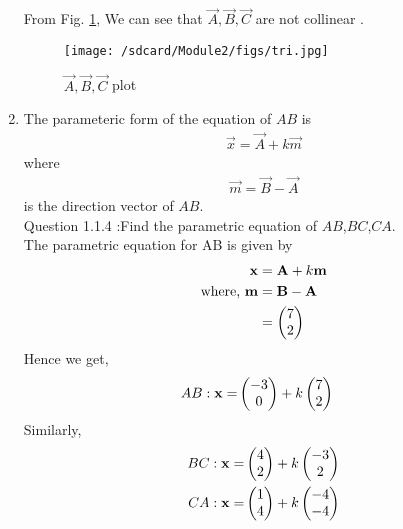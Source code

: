 \documentclass[11pt]{book}
\begin{document}
\begin{enumerate}[label=\thesection.\arabic*.,ref=\thesection.\theenumi]
From Fig. \ref{fig1:Triangle}, We can see that $\vec{A},\vec{B},\vec{C}$ are not collinear .
\begin{figure}[h]
\centering
\texttt{[image: /sdcard/Module2/figs/tri.jpg]}
\caption{$\vec{A},\vec{B},\vec{C}$ plot}
\label{fig1:Triangle}
\end{figure}



\item The parameteric form of the equation  of $AB$ is 
		\begin{align}
			\vec{x}=\vec{A}+k\vec{m}
		\end{align}
		where
		\begin{align}
\vec{m}=\vec{B}-\vec{A}
		\end{align}
is the direction vector of $AB$.\\
Question 1.1.4 :Find the parametric equation of $AB$,$BC$,$CA$.\\
\solution
The parametric equation for AB is given by
\begin{align}
\mathbf{x} &= \mathbf{A} + k\mathbf{m}\\
\text{where, } \mathbf{m} &= \mathbf{B} -\mathbf{A}\\
&= \begin{pmatrix}7 \\2\end{pmatrix}
\end{align}
Hence we get,
\begin{align}
AB: \mathbf{x} = &\begin{pmatrix}-3\\0\end{pmatrix} + k \begin{pmatrix}7\\2\end{pmatrix}
\end{align}
Similarly, 
\begin{align}
BC: \mathbf{x} = &\begin{pmatrix}4\\2\end{pmatrix} + k \begin{pmatrix}-3\\2\end{pmatrix}\\
CA: \mathbf{x} = &\begin{pmatrix}1\\4\end{pmatrix} + k \begin{pmatrix}-4\\-4\end{pmatrix}
\end{align}



\end{enumerate}
\end{document}
